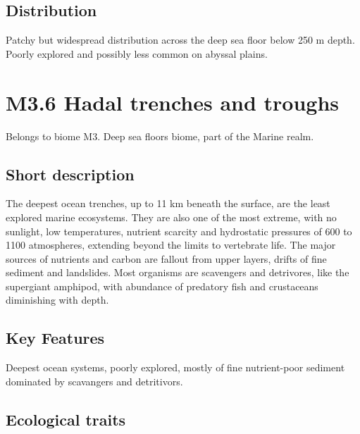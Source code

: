 \documentclass[
  letterpaper,
  DIV=11,
  numbers=noendperiod]{scrartcl}
\begin{document}
\subsection{Distribution}\label{distribution-44}

Patchy but widespread distribution across the deep sea floor below 250 m
depth. Poorly explored and possibly less common on abyssal plains.

\section{M3.6 Hadal trenches and
troughs}\label{m3.6-hadal-trenches-and-troughs}

Belongs to biome M3. Deep sea floors biome, part of the Marine realm.

\subsection{Short description}\label{short-description-45}

The deepest ocean trenches, up to 11 km beneath the surface, are the
least explored marine ecosystems. They are also one of the most extreme,
with no sunlight, low temperatures, nutrient scarcity and hydrostatic
pressures of 600 to 1100 atmospheres, extending beyond the limits to
vertebrate life. The major sources of nutrients and carbon are fallout
from upper layers, drifts of fine sediment and landslides. Most
organisms are scavengers and detrivores, like the supergiant amphipod,
with abundance of predatory fish and crustaceans diminishing with depth.

\subsection{Key Features}\label{key-features-45}

Deepest ocean systems, poorly explored, mostly of fine nutrient-poor
sediment dominated by scavangers and detritivors.

\subsection{Ecological traits}\label{ecological-traits-45}
\end{document}
